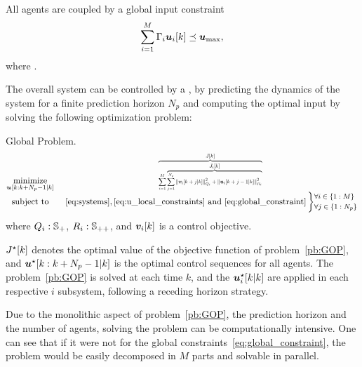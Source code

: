 \documentclass{ifacconf}  %
\begin{document}
All agents are coupled by a global input constraint
\begin{equation}
  \label{eq:global_constraint}
  \sum^{\nsubsystems}_{i=1}\Gamma_{i}\uik\preceq\umax,
\end{equation}
where .

The overall system can be controlled by a \mpc{}, by predicting the dynamics of the system for a finite prediction horizon $N_{p}$ and computing the optimal input by solving the following optimization problem:
\begin{problem}{Global \mpc{} Problem.}\label{pb:GOP}
\begin{equation*}
\begin{matrix}
\underset{\useq}{\mathrm{minimize}}&\resizebox{0.35\textwidth}{!}{$\overbrace{\sum\limits^{M}_{i=1} \overbrace{\sum_{j=1}^{\predhorz} \norm{\mpcvec{v}[i][k+j][k]}^{2}_{Q_i}+\norm{\mpcvec{u}[i][k+j-1][k]}^{2}_{R_i}}^{\textstyle{} \obji}}^{\textstyle{} \globobj}$}\\
\mathrm{subject~ to}&~\eqref{eq:systems},\eqref{eq:u_local_constraints}\ \mathrm{and}\ \eqref{eq:global_constraint}
\left\}\small
\begin{aligned}
  &\forall i\in \{1:\nsubsystems\}\\
  &\forall j\in \{1:\predhorz\}
\end{aligned}\right.

\end{matrix}
\end{equation*}
where ${Q_{i}:\mathbb{S}_{+}}$, ${R_{i}:\mathbb{S}_{++}}$, and $\vik$ is a control objective.

$\optglobobj$ denotes the optimal value of the objective function of problem~\ref{pb:GOP}, and ${\optuseq}$ is the optimal control sequences for all agents.
The problem~\ref{pb:GOP} is solved at each time $k$, and the ${\optuikk}$ are applied in each respective $i$ subsystem, following a receding horizon strategy.
\end{problem}

Due to the monolithic aspect of problem~\ref{pb:GOP}, the prediction horizon and the number of agents, solving the problem can be computationally intensive. One can see that if it were not for the global constraints~\eqref{eq:global_constraint}, the problem would be easily decomposed in $M$ parts and solvable in parallel.
\end{document}

